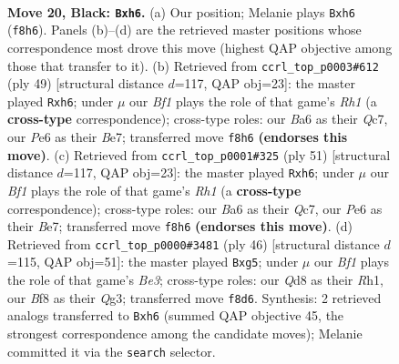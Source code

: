 \documentclass[11pt]{article}
\begin{document}
\begin{figure}[p]\centering
\begin{subfigure}{0.46\textwidth}\centering
\resizebox{\linewidth}{!}{%
\newchessgame
\chessboard[
  setfen={rn1qkb2/p7/b1p1p1pR/P1PpP3/1P3P2/2P5/3N4/R1BQK1N1 b Qq - 0 20},
  showmover=false,
  pgfstyle=straightmove, color=movearrow, markmove={f8-h6}
]}
\caption{}
\end{subfigure}\hfill
\begin{subfigure}{0.46\textwidth}\centering
\resizebox{\linewidth}{!}{%
\newchessgame
\chessboard[
  setfen={4k2r/2q1b1p1/p3p2P/4p3/1p2Pn1P/1N6/PPP2B2/1K1Q3R b k - 0 25},
  showmover=false,
  pgfstyle=straightmove, color=movearrow, markmove={h8-h6}
]}
\caption{}
\end{subfigure}
\\[4pt]
\begin{subfigure}{0.46\textwidth}\centering
\resizebox{\linewidth}{!}{%
\newchessgame
\chessboard[
  setfen={4k2r/2q1b1p1/p3p2P/4p3/1p2Pn1P/1N6/PPP2B2/1K1Q3R b k - 0 26},
  showmover=false,
  pgfstyle=straightmove, color=movearrow, markmove={h8-h6}
]}
\caption{}
\end{subfigure}\hfill
\begin{subfigure}{0.46\textwidth}\centering
\resizebox{\linewidth}{!}{%
\newchessgame
\chessboard[
  setfen={2rq1bk1/5pp1/p1p4p/1p2pNnP/4P3/4BPQ1/PPP5/1K5R w - - 0 24},
  showmover=false,
  pgfstyle=straightmove, color=movearrow, markmove={e3-g5}
]}
\caption{}
\end{subfigure}
\caption{\textbf{Move 20, Black: \texttt{Bxh6}.} (a) Our position; Melanie plays \texttt{Bxh6} (\texttt{f8h6}). Panels (b)--(d) are the retrieved master positions whose correspondence most drove this move (highest QAP objective among those that transfer to it). (b) Retrieved from \texttt{ccrl\_top\_p0003\#612} (ply 49) [structural distance $d$=117, QAP obj=23]: the master played \texttt{Rxh6}; under $\mu$ our \emph{Bf1} plays the role of that game's \emph{Rh1} (a \textbf{cross-type} correspondence); cross-type roles: our \emph{B}a6 as their \emph{Q}c7, our \emph{P}e6 as their \emph{B}e7; transferred move \texttt{f8h6} \textbf{(endorses this move)}. (c) Retrieved from \texttt{ccrl\_top\_p0001\#325} (ply 51) [structural distance $d$=117, QAP obj=23]: the master played \texttt{Rxh6}; under $\mu$ our \emph{Bf1} plays the role of that game's \emph{Rh1} (a \textbf{cross-type} correspondence); cross-type roles: our \emph{B}a6 as their \emph{Q}c7, our \emph{P}e6 as their \emph{B}e7; transferred move \texttt{f8h6} \textbf{(endorses this move)}. (d) Retrieved from \texttt{ccrl\_top\_p0000\#3481} (ply 46) [structural distance $d$=115, QAP obj=51]: the master played \texttt{Bxg5}; under $\mu$ our \emph{Bf1} plays the role of that game's \emph{Be3}; cross-type roles: our \emph{Q}d8 as their \emph{R}h1, our \emph{B}f8 as their \emph{Q}g3; transferred move \texttt{f8d6}. Synthesis: 2 retrieved analogs transferred to \texttt{Bxh6} (summed QAP objective 45, the strongest correspondence among the candidate moves); Melanie committed it via the \texttt{search} selector.}
\label{fig:thought-m39}
\end{figure}
\end{document}
